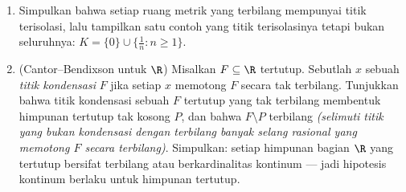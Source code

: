 \begin{problem}
\begin{enumerate}[resume]
        himpunan Cantor. Himpunan Cantor bukanlah keanehan melainkan
        benih universal bagi kesempurnaan .
  \item Simpulkan bahwa setiap ruang metrik  yang terbilang mempunyai
        titik terisolasi, lalu tampilkan satu contoh yang titik
        terisolasinya  tetapi bukan seluruhnya: $K = \{0\} \cup
        \{\frac1n : n \geq 1\}$.
  \item (Cantor--Bendixson untuk $\R$) Misalkan $F \subseteq \R$
        tertutup. Sebutlah $x$ sebuah \emph{titik kondensasi} $F$ jika
        setiap  $x$ memotong $F$ secara tak terbilang. Tunjukkan
        bahwa titik kondensasi sebuah $F$ tertutup yang tak terbilang
        membentuk himpunan tertutup  tak kosong $P$, dan bahwa $F
        \setminus P$ terbilang \emph{(selimuti titik
        yang bukan kondensasi dengan terbilang banyak selang rasional yang memotong
        $F$ secara terbilang)}. Simpulkan: setiap
        himpunan bagian $\R$ yang tertutup bersifat terbilang atau berkardinalitas
        kontinum --- jadi hipotesis kontinum berlaku
        untuk himpunan tertutup.
\end{enumerate}


\end{problem}
